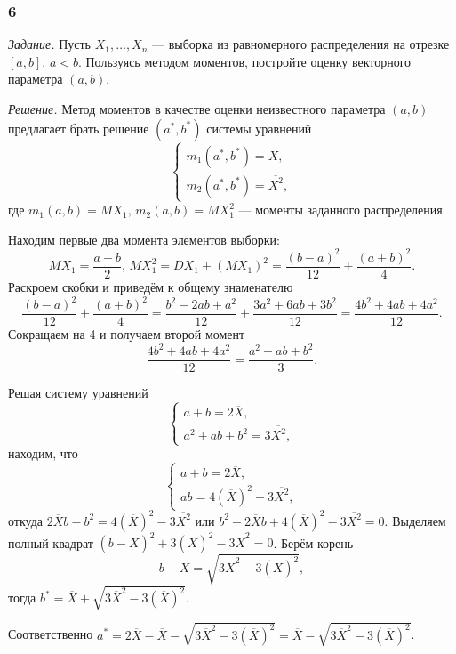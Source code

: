 \subsubsection*{6}

\textit{Задание.}
Пусть $X_1, \dotsc, X_n$ ---
выборка из равномерного распределения на отрезке $ \left[ a, b \right], \, a < b$.
Пользуясь методом моментов, постройте оценку векторного параметра $ \left( a, b \right) $.

\textit{Решение.}
Метод моментов в качестве оценки неизвестного параметра $ \left( a, b \right) $
предлагает брать решение $ \left( a^*, b^* \right) $ системы уравнений
$$ \begin{cases}
    m_1 \left( a^*, b^* \right) = \overline{X}, \\
    m_2 \left( a^*, b^* \right) = \overline{X^2},
  \end{cases}$$
где $m_1 \left( a, b \right) = MX_1, \, m_2 \left( a, b \right) = MX_1^2$ ---
моменты заданного распределения.

Находим первые два момента элементов выборки:
$$MX_1 = \frac{a + b}{2}, \,
  MX_1^2 =
  DX_1 + \left( MX_1 \right)^2 =
  \frac{ \left( b - a \right)^2}{12} + \frac{ \left( a + b \right)^2}{4}.$$
Раскроем скобки и приведём к общему знаменателю
$$ \frac{ \left( b - a \right)^2}{12} + \frac{ \left( a + b \right)^2}{4} =
  \frac{b^2 - 2ab + a^2}{12} + \frac{3a^2 + 6ab + 3b^2}{12} =
  \frac{4b^2 + 4ab + 4a^2}{12}.$$
Сокращаем на 4 и получаем второй момент
$$ \frac{4b^2 + 4ab + 4a^2}{12} =
  \frac{a^2 + ab + b^2}{3}.$$

Решая систему уравнений
$$ \begin{cases}
    a + b = 2 \overline{X}, \\
    a^2 + ab + b^2 = 3 \overline{X^2},
  \end{cases}$$
находим, что
$$ \begin{cases}
    a + b = 2 \overline{X}, \\
    ab = 4 \left( \overline{X} \right)^2 - 3 \overline{X^2},
  \end{cases}$$
откуда $2 \overline{X} b - b^2 = 4 \left( \overline{X} \right)^2 - 3 \overline{X^2}$ или
$b^2 - 2 \overline{X} b + 4 \left( \overline{X} \right)^2 - 3 \overline{X^2} = 0$.
Выделяем полный квадрат
$ \left( b - \overline{X} \right)^2 + 3 \left( \overline{X} \right)^2 - 3 \overline{X}^2 =
  0$.
Берём корень
$$b - \overline{X} =
  \sqrt{3 \overline{X}^2 - 3 \left( \overline{X} \right)^2},$$
тогда $b^* = \overline{X} + \sqrt{3 \overline{X}^2 - 3 \left( \overline{X} \right)^2}$.

Соответственно
$a^* =
  2 \overline{X} - \overline{X} - \sqrt{3 \overline{X}^2 - 3 \left( \overline{X} \right)^2} =
  \overline{X} - \sqrt{3 \overline{X}^2 - 3 \left( \overline{X} \right)^2}$.
